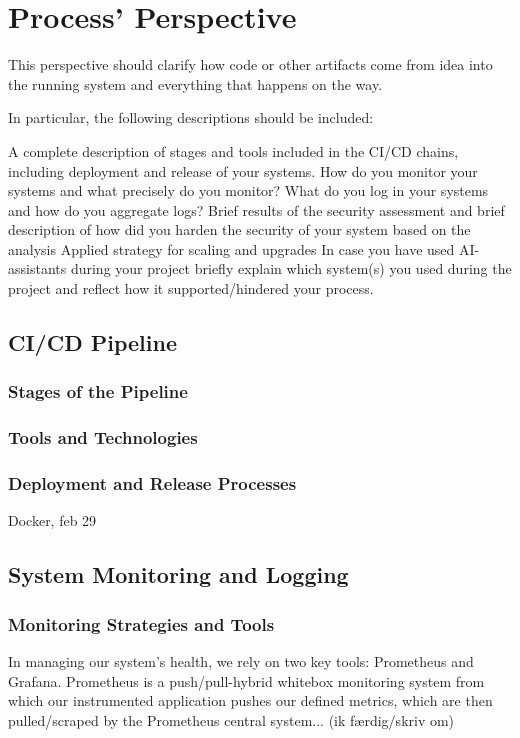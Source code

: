 \section{Process' Perspective}
This perspective should clarify how code or other artifacts come from idea into the running system and everything that happens on the way.

In particular, the following descriptions should be included:

A complete description of stages and tools included in the CI/CD chains, including deployment and release of your systems.
How do you monitor your systems and what precisely do you monitor?
What do you log in your systems and how do you aggregate logs?
Brief results of the security assessment and brief description of how did you harden the security of your system based on the analysis
Applied strategy for scaling and upgrades
In case you have used AI-assistants during your project briefly explain which system(s) you used during the project and reflect how it supported/hindered your process.

\subsection{CI/CD Pipeline}
\subsubsection*{Stages of the Pipeline}
\subsubsection*{Tools and Technologies}
\subsubsection*{Deployment and Release Processes}
Docker, feb 29
\subsection{System Monitoring and Logging}
\subsubsection*{Monitoring Strategies and Tools}
In managing our system's health, we rely on two key tools: Prometheus and Grafana. Prometheus is a push/pull-hybrid whitebox monitoring system from which our instrumented application pushes our defined metrics, which are then pulled/scraped by the Prometheus central system... (ik færdig/skriv om)\\


